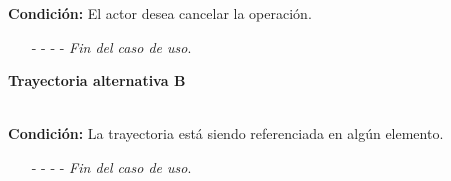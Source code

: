 \noindent \textbf{Condición:} El actor desea cancelar la operación.
\begin{enumerate}
	\UCpaso[\UCactor] Oprime el botón  de la pantalla emergente.
	\UCpaso[\UCsist] Muestra la pantalla .
	\item[- -] - - {\em {Fin del caso de uso}}.%
\end{enumerate}
	\hypertarget{CU12-1-1-3:TAB}{\textbf{Trayectoria alternativa B}}\\
	\noindent \textbf{Condición:} La trayectoria está siendo referenciada en algún elemento.
	\begin{enumerate}
		\UCpaso[\UCsist] Muestra el mensaje  en la pantalla  en una pantalla emergente con la lista de elementos que están referenciando a la trayectoria.
		\UCpaso[\UCactor] Oprime el botón  de la pantalla emergente.
		\UCpaso[\UCsist] Muestra la pantalla .
		\item[- -] - - {\em {Fin del caso de uso}}.
	\end{enumerate}

